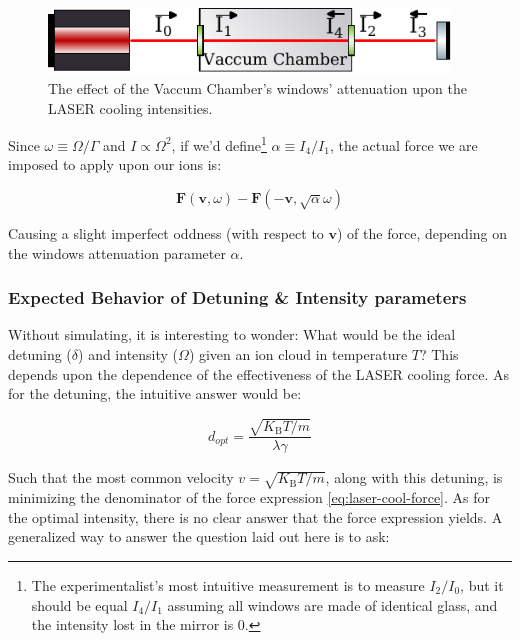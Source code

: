 \begin{figure}[h!]
	\begin{center}
		\includegraphics[width=0.95\textwidth]{graphics/windows-attenuation.pdf}
	\end{center}
	\caption{The effect of the Vaccum Chamber's windows' attenuation upon the LASER cooling intensities.}\label{fig:windows-attenuation}
\end{figure}

Since $\omega \equiv \Omega/\Gamma$ and $I \propto \Omega^2$, if we'd define\footnote{The experimentalist's most intuitive measurement is to measure $I_2/I_0$, but it should be equal $I_4/I_1$ assuming all windows are made of identical glass, and the intensity lost in the mirror is 0.} $\alpha \equiv I_4/I_1$, the actual force we are imposed to apply upon our ions is:

\begin{equation}
	\mathbf{F}(\mathbf{v}, \omega) - \mathbf{F}(-\mathbf{v}, \sqrt{\alpha}\omega)
\end{equation}

Causing a slight imperfect oddness (with respect to $\mathbf{v}$) of the force, depending on the windows attenuation parameter $\alpha$.

\subsubsection{Expected Behavior of Detuning \& Intensity parameters}

Without simulating, it is interesting to wonder: What would be the ideal detuning ($\delta$) and intensity ($\Omega$) given an ion cloud in temperature $T$? This depends upon the dependence of the effectiveness of the LASER cooling force. As for the detuning, the intuitive answer would be:

\begin{equation}
	d_{opt} = \frac{\sqrt{K_\text{B} T/m}}{\lambda\gamma}
	\label{eq:back-of-envelope-detuning-T}
\end{equation}

Such that the most common velocity $v = \sqrt{K_\text{B} T/m}$, along with this detuning, is minimizing the denominator of the force expression \ref{eq:laser-cool-force}. As for the optimal intensity, there is no clear answer that the force expression yields. A generalized way to answer the question laid out here is to ask:

